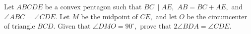 Let $ABCDE$ be a convex pentagon such that $BC \parallel AE,$ $AB = BC +  AE,$ and $\angle ABC = \angle CDE.$ Let $M$ be the midpoint of $CE,$ and let $O$ be the circumcenter of triangle $BCD.$ Given that $\angle DMO = 90^{\circ},$ prove that $2 \angle BDA = \angle CDE.$